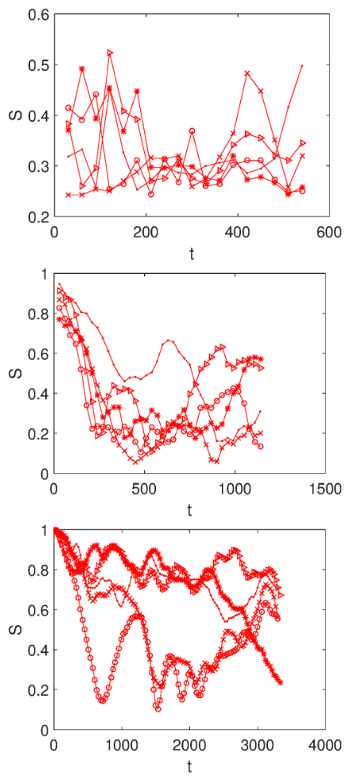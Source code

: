 \documentclass[aps,pre,twocolumn,groupedaddress]{revtex4-1}
\begin{document}
\begin{figure}
\centering
\includegraphics[scale=0.4]{ZhiyuPictures/N=20_shape_F=1000_E=3000.eps}
\includegraphics[scale=0.4]{ZhiyuPictures/N=20_shape_F=1000_E=20000.eps}
\includegraphics[scale=0.4]{ZhiyuPictures/N=20_shape_F=1000_E=100000.eps}

\end{figure}
\end{document}

